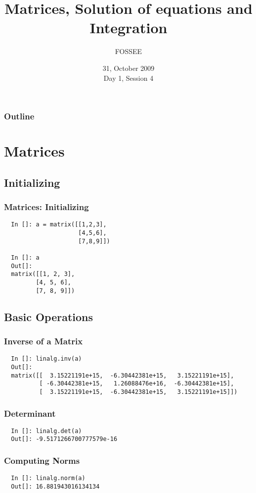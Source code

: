 \documentclass[14pt,compress]{beamer}
\title[Basic Python]{Matrices, Solution of equations and Integration\\}
\author[FOSSEE] {FOSSEE}
\institute[IIT Bombay] {Department of Aerospace Engineering\\IIT Bombay}
\date[] {31, October 2009\\Day 1, Session 4}
\begin{document}
\begin{frame}
  \titlepage
\end{frame}

\begin{frame}
  \frametitle{Outline}
  \tableofcontents
\end{frame}

\section{Matrices}
\subsection{Initializing}
\begin{frame}[fragile]
\frametitle{Matrices: Initializing}
\begin{lstlisting}
  In []: a = matrix([[1,2,3],
                     [4,5,6],
                     [7,8,9]])

  In []: a
  Out[]: 
  matrix([[1, 2, 3],
         [4, 5, 6],
         [7, 8, 9]])
\end{lstlisting}
\end{frame}

\subsection{Basic Operations}
\begin{frame}[fragile]
\frametitle{Inverse of a Matrix}
\begin{small}
\begin{lstlisting}
  In []: linalg.inv(a)
  Out[]: 
  matrix([[  3.15221191e+15,  -6.30442381e+15,   3.15221191e+15],
          [ -6.30442381e+15,   1.26088476e+16,  -6.30442381e+15],
          [  3.15221191e+15,  -6.30442381e+15,   3.15221191e+15]])
\end{lstlisting}
\end{small}
\end{frame}

\begin{frame}[fragile]
\frametitle{Determinant}
\begin{lstlisting}
  In []: linalg.det(a)
  Out[]: -9.5171266700777579e-16
\end{lstlisting}
\end{frame}

\begin{frame}[fragile]
\frametitle{Computing Norms}
\begin{lstlisting}
  In []: linalg.norm(a)
  Out[]: 16.881943016134134
\end{lstlisting}
\end{frame}
\end{document}
